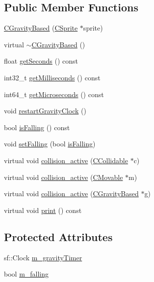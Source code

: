 \subsection*{Public Member Functions}
\begin{DoxyCompactItemize}
\item 
\hyperlink{classengine_1_1CGravityBased_a30378d0b24aa6313d12dc80d73492ca8}{C\-Gravity\-Based} (\hyperlink{classengine_1_1CSprite}{C\-Sprite} $\ast$sprite)
\item 
virtual \hyperlink{classengine_1_1CGravityBased_ad29312b47a2cb90d704b0557287c463c}{$\sim$\-C\-Gravity\-Based} ()
\item 
float \hyperlink{classengine_1_1CGravityBased_a723ff2142db951f2de1936b895e4037b}{get\-Seconds} () const 
\item 
int32\-\_\-t \hyperlink{classengine_1_1CGravityBased_a3b08ec9890633769718987a88a80ef83}{get\-Milliseconds} () const 
\item 
int64\-\_\-t \hyperlink{classengine_1_1CGravityBased_ae8168fa3497abc6a1a6fd06124b751e5}{get\-Microseconds} () const 
\item 
void \hyperlink{classengine_1_1CGravityBased_a43969612f1a106a54fd225e88bb6dd73}{restart\-Gravity\-Clock} ()
\item 
bool \hyperlink{classengine_1_1CGravityBased_aafff7dd45619ea9a948b266e364de4d8}{is\-Falling} () const 
\item 
void \hyperlink{classengine_1_1CGravityBased_aaaa791268b4c455f6137a3319473bf3c}{set\-Falling} (bool \hyperlink{classengine_1_1CGravityBased_aafff7dd45619ea9a948b266e364de4d8}{is\-Falling})
\item 
virtual void \hyperlink{classengine_1_1CGravityBased_aedf5cefc210d802cd219366b30ced9f8}{collision\-\_\-active} (\hyperlink{classengine_1_1CCollidable}{C\-Collidable} $\ast$c)
\item 
virtual void \hyperlink{classengine_1_1CGravityBased_a47f5f1081f356b4941401e0648a2a3f9}{collision\-\_\-active} (\hyperlink{classengine_1_1CMovable}{C\-Movable} $\ast$m)
\item 
virtual void \hyperlink{classengine_1_1CGravityBased_ac04bb2389041ba872a22cd575ae52dd6}{collision\-\_\-active} (\hyperlink{classengine_1_1CGravityBased}{C\-Gravity\-Based} $\ast$g)
\item 
virtual void \hyperlink{classengine_1_1CGravityBased_a1fd898d6529eeb9bb8651d7d9bcdb89c}{print} () const 
\end{DoxyCompactItemize}
\subsection*{Protected Attributes}
\begin{DoxyCompactItemize}
\item 
sf\-::\-Clock \hyperlink{classengine_1_1CGravityBased_a124ef300a1b855b6b508bdfede4fca39}{m\-\_\-gravity\-Timer}
\item 
bool \hyperlink{classengine_1_1CGravityBased_a25ea6b058b1c266b9307434bd0446828}{m\-\_\-falling}
\end{DoxyCompactItemize}


